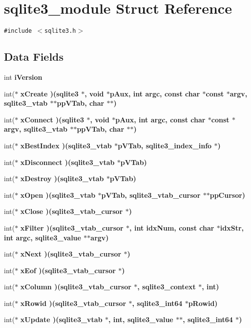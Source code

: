 \section{sqlite3\_\-module Struct Reference}
\label{structsqlite3__module}
{\tt \#include $<$sqlite3.h$>$}

\subsection*{Data Fields}
\begin{CompactItemize}
\item 
int \bf{i\-Version}
\item 
int($\ast$ \bf{x\-Create} )(\bf{sqlite3} $\ast$, void $\ast$p\-Aux, int argc, const char $\ast$const $\ast$argv, \bf{sqlite3\_\-vtab} $\ast$$\ast$pp\-VTab, char $\ast$$\ast$)
\item 
int($\ast$ \bf{x\-Connect} )(\bf{sqlite3} $\ast$, void $\ast$p\-Aux, int argc, const char $\ast$const $\ast$argv, \bf{sqlite3\_\-vtab} $\ast$$\ast$pp\-VTab, char $\ast$$\ast$)
\item 
int($\ast$ \bf{x\-Best\-Index} )(\bf{sqlite3\_\-vtab} $\ast$p\-VTab, \bf{sqlite3\_\-index\_\-info} $\ast$)
\item 
int($\ast$ \bf{x\-Disconnect} )(\bf{sqlite3\_\-vtab} $\ast$p\-VTab)
\item 
int($\ast$ \bf{x\-Destroy} )(\bf{sqlite3\_\-vtab} $\ast$p\-VTab)
\item 
int($\ast$ \bf{x\-Open} )(\bf{sqlite3\_\-vtab} $\ast$p\-VTab, \bf{sqlite3\_\-vtab\_\-cursor} $\ast$$\ast$pp\-Cursor)
\item 
int($\ast$ \bf{x\-Close} )(\bf{sqlite3\_\-vtab\_\-cursor} $\ast$)
\item 
int($\ast$ \bf{x\-Filter} )(\bf{sqlite3\_\-vtab\_\-cursor} $\ast$, int idx\-Num, const char $\ast$idx\-Str, int argc, \bf{sqlite3\_\-value} $\ast$$\ast$argv)
\item 
int($\ast$ \bf{x\-Next} )(\bf{sqlite3\_\-vtab\_\-cursor} $\ast$)
\item 
int($\ast$ \bf{x\-Eof} )(\bf{sqlite3\_\-vtab\_\-cursor} $\ast$)
\item 
int($\ast$ \bf{x\-Column} )(\bf{sqlite3\_\-vtab\_\-cursor} $\ast$, \bf{sqlite3\_\-context} $\ast$, int)
\item 
int($\ast$ \bf{x\-Rowid} )(\bf{sqlite3\_\-vtab\_\-cursor} $\ast$, \bf{sqlite3\_\-int64} $\ast$p\-Rowid)
\item 
int($\ast$ \bf{x\-Update} )(\bf{sqlite3\_\-vtab} $\ast$, int, \bf{sqlite3\_\-value} $\ast$$\ast$, \bf{sqlite3\_\-int64} $\ast$)
$$
\end{CompactItemize}
